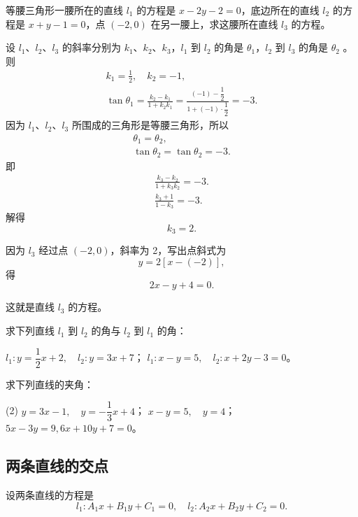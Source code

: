 \begin{example}
  等腰三角形一腰所在的直线 $l_1$ 的方程是 $x-2y-2=0$，底边所在的直线 $l_2$ 的方程是 $x+y-1=0$，点 $(-2,0)$ 在另一腰上，求这腰所在直线 $l_3$ 的方程。
\end{example}
\begin{solution}
  设 $l_1$、$l_2$、$l_3$ 的斜率分别为 $k_1$、$k_2$、$k_3$，$l_1$ 到 $l_2$ 的角是 $\theta_1$，$l_2$ 到 $l_3$ 的角是 $\theta_2$ 。则
  \begin{gather*} 
    k_1=\frac{1}{2},\quad k_2=-1,\\
    \tan\theta_1=\frac{k_2-k_1}{1+k_2k_1}=\frac{(-1)-\dfrac{1}{2}}{1+(-1)\cdot\dfrac{1}{2}}=-3.
  \end{gather*}
  因为 $l_1$、$l_2$、$l_3$ 所围成的三角形是等腰三角形，所以
  \begin{gather*} 
    \theta_1=\theta_2,\\
    \tan\theta_2=\tan\theta_2=-3.
  \end{gather*}
  即
  \begin{gather*} 
    \frac{k_3-k_2}{1+k_3k_2}=-3.\\
    \frac{k_3+1}{1-k_3}=-3.
  \end{gather*}
  解得
  \[ k_3=2.\]

  因为 $l_3$ 经过点 $(-2,0)$，斜率为 2，写出点斜式为
  \[ y=2[x-(-2)],\]
  得
  \[ 2x-y+4=0.\]

  这就是直线 $l_3$ 的方程。
\end{solution}

\begin{Practice}
  \begin{question}
    \item 求下列直线 $l_1$ 到 $l_2$ 的角与 $l_2$ 到 $l_1$ 的角：
    \begin{tasks}
      \task $l_1: y=\dfrac{1}{2}x+2,\quad l_2:y=3x+7$；
      \task $l_1: x-y=5,\quad l_2: x+2y-3=0$。
    \end{tasks}
    \item 求下列直线的夹角：
    \begin{tasks}(2)
      \task $y=3x-1,\quad y=-\dfrac{1}{3}x+4$；
      \task $x-y=5, \quad y=4$；
      \task $5x-3y=9, 6x+10y+7=0$。
    \end{tasks}
  \end{question}
\end{Practice}

\subsection{两条直线的交点}
设两条直线的方程是
\[l_1:A_1x+B_1y+C_1=0,\quad l_2:A_2x+B_2y+C_2=0.\]

